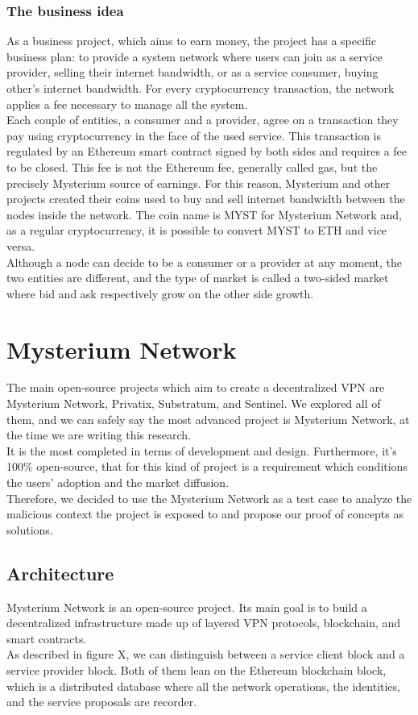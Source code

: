 \documentclass[12pt]{article}
\begin{document}
	\subsubsection{The business idea}
	As a business project, which aims to earn money, the project has a specific business plan: to provide a system network where users can join as a service provider, selling their internet bandwidth, or as a service consumer, buying other's internet bandwidth. For every cryptocurrency transaction, the network applies a fee necessary to manage all the system.\\
	Each couple of entities, a consumer and a provider, agree on a transaction they pay using cryptocurrency in the face of the used service. This transaction is regulated by an Ethereum smart contract signed by both sides and requires a fee to be closed. This fee is not the Ethereum fee, generally called gas, but the precisely Mysterium source of earnings. For this reason, Mysterium and other projects created their coins used to buy and sell internet bandwidth between the nodes inside the network. The coin name is MYST for Mysterium Network and, as a regular cryptocurrency, it is possible to convert MYST to ETH and vice versa.\\
	Although a node can decide to be a consumer or a provider at any moment, the two entities are different, and the type of market is called a two-sided market where bid and ask respectively grow on the other side growth.
	\bigbreak

	\newpage
	\section{Mysterium Network}
	The main open-source projects which aim to create a decentralized VPN are Mysterium Network, Privatix, Substratum, and Sentinel. We explored all of them, and we can safely say the most advanced project is Mysterium Network, at the time we are writing this research.\\It is the most completed in terms of development and design. Furthermore, it's 100\% open-source, that for this kind of project is a requirement which conditions the users' adoption and the market diffusion.\\
	Therefore, we decided to use the Mysterium Network as a test case to analyze the malicious context the project is exposed to and propose our proof of concepts as solutions.
	
	\subsection{Architecture}
	Mysterium Network is an open-source project. Its main goal is to build a decentralized infrastructure made up of layered VPN protocols, blockchain, and smart contracts.\\
	As described in figure X, we can distinguish between a service client block and a service provider block. Both of them lean on the Ethereum blockchain block, which is a distributed database where all the network operations, the identities, and the service proposals are recorder.\\
	\bigbreak
	
\end{document}
